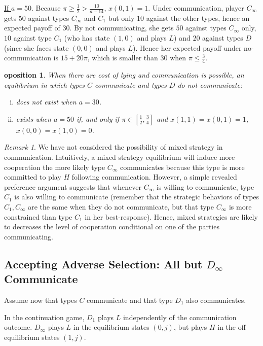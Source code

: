 \documentclass[12pt]{article}
\newtheorem{proposition}{\text{Pr}oposition}
\theoremstyle{definition}
\theoremstyle{remark}
\newtheorem{remark}{Remark}
\begin{document}
\underline{If $a=50$}. Because $\pi\geq \frac{1}{2}>\frac{10}{a-14}$, $x(0,1)=1$. Under communication, player $C_\infty$ gets $50$ against types $C_\infty$ and $C_1$ but only $10$ against the other types, hence an expected payoff of $30$. By not communicating, she gets $50$ against types $C_\infty$ only, $10$ against type $C_1$ (who has state $(1,0)$ and plays $L$) and $20$ against types $D$ (since she faces state $(0,0)$ and plays $L$). Hence her expected payoff under no-communication is $15+20\pi$, which is smaller than $30$ when $\pi\leq \frac{3}{4}$.
%
\begin{proposition}\label{prop:CT-allC}
When there are cost of lying and communication is possible, an equilibrium in which types $C$ communicate and types $D$ do not communicate:
\begin{enumerate}[(i)]
    \item does not exist when $a=30$.
    \item exists when $a=50$ if, and only if $\pi\in\left[\frac{1}{2},\frac{3}{4}\right]$ and $x(1,1)=x(0,1)=1$, $x(0,0)=x(1,0)=0$.
\end{enumerate}
	
\end{proposition}

\begin{remark}
    We have not considered the possibility of mixed strategy in communication. Intuitively, a mixed strategy equilibrium will induce more cooperation the more likely type $C_\infty$ communicates because this type is more committed to play $H$ following communication. However, a simple revealed preference argument suggests that whenever $C_\infty$ is willing to communicate, type $C_1$ is also willing to communicate (remember that the strategic behaviors of types $C_1,C_\infty$ are the same when they do not communicate, but that type $C_\infty$ is more constrained than type $C_1$ in her best-response). Hence, mixed strategies are likely to decreases the level of cooperation conditional on one of the parties communicating. 
\end{remark}

\subsection{Accepting  Adverse Selection: All but $D_\infty$ Communicate} Assume now that types $C$ communicate and that type $D_1$ also communicates. 

In the continuation game, $D_1$ plays $L$ independently of the communication outcome. $D_\infty$ plays $L$ in the equilibrium states $(0,j)$, but plays $H$ in the off equilibrium states $(1,j)$.
\end{document}
